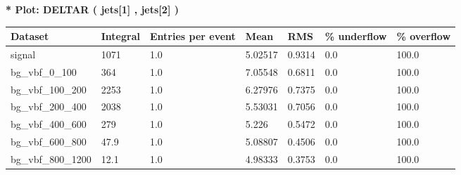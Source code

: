 \documentclass[a4paper, 10pt]{article}
\begin{document}
\textbf{* Plot: DELTAR ( jets[1] , jets[2] ) }\\
   \begin{table}[H]
  \begin{center}
    \begin{tabular}{|m{23.0mm}|m{23.0mm}|m{18.0mm}|m{19.0mm}|m{19.0mm}|m{19.0mm}|m{19.0mm}|}
      \hline
      {\cellcolor{yellow}         Dataset}& {\cellcolor{yellow}         Integral}& {\cellcolor{yellow}         Entries per event}& {\cellcolor{yellow}         Mean}& {\cellcolor{yellow}         RMS}& {\cellcolor{yellow}         \% underflow}& {\cellcolor{yellow}         \% overflow}\\
      \hline
      {\cellcolor{white}         signal}& {\cellcolor{white}         1071}& {\cellcolor{white}         1.0}& {\cellcolor{white}         5.02517}& {\cellcolor{white}         0.9314}& {\cellcolor{red}         0.0}& {\cellcolor{red}         100.0}\\
      \hline
      {\cellcolor{white}         bg\_vbf\_0\_100}& {\cellcolor{white}         364}& {\cellcolor{white}         1.0}& {\cellcolor{white}         7.05548}& {\cellcolor{white}         0.6811}& {\cellcolor{red}         0.0}& {\cellcolor{red}         100.0}\\
      \hline
      {\cellcolor{white}         bg\_vbf\_100\_200}& {\cellcolor{white}         2253}& {\cellcolor{white}         1.0}& {\cellcolor{white}         6.27976}& {\cellcolor{white}         0.7375}& {\cellcolor{red}         0.0}& {\cellcolor{red}         100.0}\\
      \hline
      {\cellcolor{white}         bg\_vbf\_200\_400}& {\cellcolor{white}         2038}& {\cellcolor{white}         1.0}& {\cellcolor{white}         5.53031}& {\cellcolor{white}         0.7056}& {\cellcolor{red}         0.0}& {\cellcolor{red}         100.0}\\
      \hline
      {\cellcolor{white}         bg\_vbf\_400\_600}& {\cellcolor{white}         279}& {\cellcolor{white}         1.0}& {\cellcolor{white}         5.226}& {\cellcolor{white}         0.5472}& {\cellcolor{red}         0.0}& {\cellcolor{red}         100.0}\\
      \hline
      {\cellcolor{white}         bg\_vbf\_600\_800}& {\cellcolor{white}         47.9}& {\cellcolor{white}         1.0}& {\cellcolor{white}         5.08807}& {\cellcolor{white}         0.4506}& {\cellcolor{red}         0.0}& {\cellcolor{red}         100.0}\\
      \hline
      {\cellcolor{white}         bg\_vbf\_800\_1200}& {\cellcolor{white}         12.1}& {\cellcolor{white}         1.0}& {\cellcolor{white}         4.98333}& {\cellcolor{white}         0.3753}& {\cellcolor{red}         0.0}& {\cellcolor{red}         100.0}\\

\end{tabular}
\end{center}
\end{table}
\end{document}
